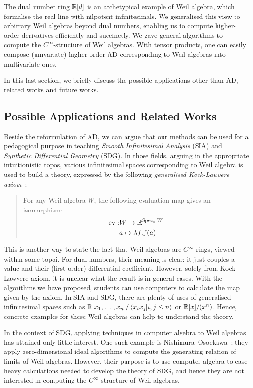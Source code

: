 The dual number ring $\mathbb{R}[d]$ is an archetypical example of Weil algebra, which formalise the real line with nilpotent infinitesimals.
We generalised this view to arbitrary Weil algebras beyond dual numbers, enabling us to compute higher-order derivatives efficiently and succinctly.
We gave general algorithms to compute the $C^\infty$-structure of Weil algebras.
With tensor products, one can easily compose (univariate) higher-order AD corresponding to Weil algebras into multivariate ones.

In this last section, we briefly discuss the possible applications other than AD, related works and future works.

\subsection{Possible Applications and Related Works}
Beside the reformulation of AD, we can argue that our methods can be used for a pedagogical purpose in teaching \emph{Smooth Infinitesimal Analysis} (SIA) and \emph{Synthetic Differential Geometry} (SDG).
In those fields, arguing in the appropriate intuitionistic topos, various infinitesimal spaces corresponding to Weil algebra is used to build a theory, expressed by the following \emph{generalised Kock-Lawvere axiom}~\cite{Moerdijk:1991aa}:

\begin{quote}
  For any Weil algebra $W$, the following evaluation map gives an isomorphism:
  \begin{align*}
    \mathop{\mathrm{ev}}: &W \to   \mathbb{R}^{\mathop{\mathrm{Spec}}_{\mathbb{R}}{W}}\\
       &a \mapsto \lambda f. f(a)
  \end{align*}
\end{quote}
This is another way to state the fact that Weil algebras are $C^\infty$-rings, viewed within some topoi.
For dual numbers, their meaning is clear: it just couples a value and their (first-order) differential coefficient.
However, solely from Kock-Lawvere axiom, it is unclear what the result is in general cases.
With the algorithms we have proposed, students can use computers to calculate the map given by the axiom.
In SIA and SDG, there are plenty of uses of generalised infinitesimal spaces such as $\mathbb{R}[x_1,\dots, x_n]/\braket{x_i x_j | i, j \leq n}$ or $\mathbb{R}[x]/(x^n)$.
Hence, concrete examples for these Weil algebras can help to understand the theory.

In the context of SDG, applying techniques in computer algebra to Weil algebras has attained only little interest.
One such example is Nishimura--Osoekawa~\cite{Nishimura:2007aa}: they apply zero-dimensional ideal algorithms to compute the generating relation of limits of Weil algebras.
However, their purpose is to use computer algebra to ease heavy calculations needed to develop the theory of SDG, and hence they are not interested in computing the $C^\infty$-structure of Weil algebras.

